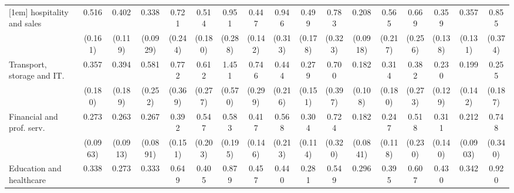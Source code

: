 {\begin{tabular}{l*{16}{c}}
[1em]
hospitality and sales&       0.516\sym{*}  &       0.402\sym{**} &       0.338\sym{***}&       0.721         &       0.514         &       0.951         &       0.447\sym{*}  &       0.946         &       0.499         &       0.783         &       0.208\sym{***}&       0.565         &       0.669         &       0.359\sym{**} &       0.357\sym{**} &       0.855         \\
                    &     (0.161)         &     (0.119)         &    (0.0929)         &     (0.244)         &     (0.180)         &     (0.288)         &     (0.142)         &     (0.313)         &     (0.178)         &     (0.323)         &    (0.0918)         &     (0.217)         &     (0.256)         &     (0.138)         &     (0.131)         &     (0.374)         \\
[1em]
Transport, storage and IT.&       0.357\sym{*}  &       0.394         &       0.581         &       0.772         &       0.612         &       1.451         &       0.746         &       0.444         &       0.279\sym{*}  &       0.700         &       0.182\sym{**} &       0.314\sym{*}  &       0.382         &       0.230\sym{**} &       0.199\sym{*}  &       0.255         \\
                    &     (0.180)         &     (0.189)         &     (0.252)         &     (0.369)         &     (0.277)         &     (0.570)         &     (0.299)         &     (0.216)         &     (0.151)         &     (0.397)         &     (0.108)         &     (0.180)         &     (0.273)         &     (0.129)         &     (0.142)         &     (0.187)         \\
[1em]
Financial and prof. serv.&       0.273\sym{***}&       0.263\sym{***}&       0.267\sym{***}&       0.392\sym{*}  &       0.547         &       0.583         &       0.417\sym{*}  &       0.568         &       0.304\sym{**} &       0.724         &       0.182\sym{***}&       0.247\sym{**} &       0.518         &       0.311\sym{**} &       0.212\sym{***}&       0.748         \\
                    &    (0.0963)         &    (0.0913)         &    (0.0891)         &     (0.151)         &     (0.203)         &     (0.195)         &     (0.146)         &     (0.213)         &     (0.114)         &     (0.320)         &    (0.0841)         &     (0.118)         &     (0.230)         &     (0.140)         &    (0.0903)         &     (0.340)         \\
[1em]
Education and healthcare&       0.338\sym{**} &       0.273\sym{***}&       0.333\sym{***}&       0.649         &       0.405\sym{*}  &       0.879         &       0.457\sym{*}  &       0.440\sym{*}  &       0.281\sym{***}&       0.549         &       0.296\sym{**} &       0.395\sym{*}  &       0.607         &       0.430\sym{*}  &       0.342\sym{**} &       0.920         \\

\end{tabular}}
